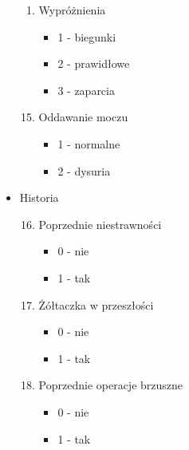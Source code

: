 \documentclass{report}
\begin{document}
\begin{itemize}
\begin{enumerate}
            \item Wypróżnienia
            \begin{itemize}
                \item 1 - biegunki
                \item 2 - prawidłowe
                \item 3 - zaparcia
            \end{itemize}
        \end{enumerate}
        \begin{enumerate}
            \setcounter{enumi}{14}
            \item Oddawanie moczu
            \begin{itemize}
                \item 1 - normalne
                \item 2 - dysuria
            \end{itemize}
        \end{enumerate}
        \item Historia
        \begin{enumerate}
            \setcounter{enumi}{15}
            \item Poprzednie niestrawności
            \begin{itemize}
                \item 0 - nie
                \item 1 - tak
            \end{itemize}
        \end{enumerate}
        \begin{enumerate}
            \setcounter{enumi}{16}
            \item Żółtaczka w przeszłości
            \begin{itemize}
                \item 0 - nie
                \item 1 - tak
            \end{itemize}
        \end{enumerate}
        \begin{enumerate}
            \setcounter{enumi}{17}
            \item Poprzednie operacje brzuszne
            \begin{itemize}
                \item 0 - nie
                \item 1 - tak
            \end{itemize}
        \end{enumerate}

\end{itemize}
\end{document}
